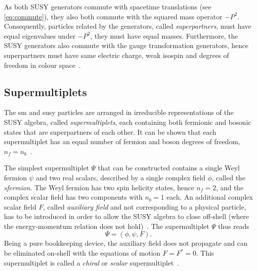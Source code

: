 As both SUSY generators commute with spacetime translations (see \cref{eq:commute}), they also both commute with the squared mass operator $-P^2$. Consequently, particles related by the generators, called \textit{superpartners}, must have equal eigenvalues under $-P^2$, \ie they must have equal masses. Furthermore, the SUSY generators also commute with the gauge transformation generators, hence superpartners must have same electric charge, weak isospin and degrees of freedom in colour space~\cite{Martin:1997ns}.


\subsection{Supermultiplets}\label{sec:supermultiplets}

The \gls{sm} and \gls{susy} particles are arranged in irreducible representations of the SUSY algebra, called \textit{supermultiplets}, each containing both fermionic and bosonic states that are superpartners of each other. It can be shown that each supermultiplet has an equal number of fermion and boson degrees of freedom, $n_f = n_b$~\cite{Martin:1997ns}.

The simplest supermultiplet $\Psi$ that can be constructed contains a single Weyl fermion $\psi$ and two real scalars, described by a single complex field $\phi$, called the \textit{sfermion}. The Weyl fermion has two spin helicity states, hence $n_f=2$, and the complex scalar field has two components with $n_b=1$ each. An additional complex scalar field $F$, called \textit{auxiliary field} and not corresponding to a physical particle, has to be introduced in order to allow the SUSY algebra to close off-shell (where the energy-momentum relation does not hold)~\cite{Martin:1997ns}. The supermultiplet $\Psi$ thus reads
\begin{equation}
	\Psi = (\phi,\psi,F).
\end{equation}
Being a pure bookkeeping device, the auxiliary field does not propagate and can be eliminated on-shell with the equations of motion $F=F^*=0$. This supermultiplet is called a \textit{chiral} or \textit{scalar} supermultiplet~\cite{Martin:1997ns}. 

